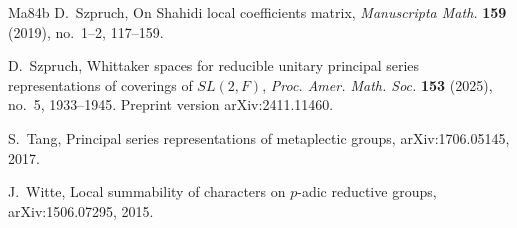\documentclass[12pt,letterpaper]{article}
\numberwithin{equation}{section}
\theoremstyle{plain}
\theoremstyle{definition}
\theoremstyle{remark}
\begin{document}
\begin{thebibliography}{Ma84b}
 D.~Szpruch, On Shahidi local coefficients matrix,
\emph{Manuscripta Math.} \textbf{159} (2019), no.~1--2, 117--159.

 D.~Szpruch, Whittaker spaces for reducible unitary
principal series representations of coverings of $SL(2,F)$,
\emph{Proc. Amer. Math. Soc.} \textbf{153} (2025), no.~5, 1933--1945.
Preprint version arXiv:2411.11460.

 S.~Tang, Principal series representations of
metaplectic groups, arXiv:1706.05145, 2017.

 J.~Witte, Local summability of characters on
$p$-adic reductive groups, arXiv:1506.07295, 2015.

\end{thebibliography}
\end{document}
